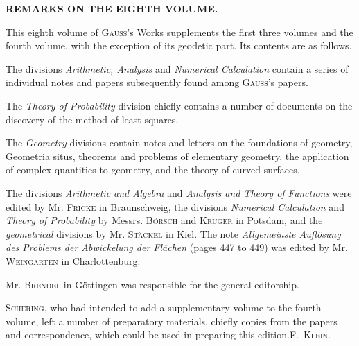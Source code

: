 \begin{center}\Large\bfseries REMARKS ON THE EIGHTH VOLUME.\end{center}

This eighth volume of \textsc{Gauss}'s Works supplements the first three volumes and the fourth volume, with the exception of its geodetic part. Its contents are as follows.

The divisions \textit{Arithmetic, Analysis} and \textit{Numerical Calculation} contain a series of individual notes and papers subsequently found among \textsc{Gauss}'s papers.

The \textit{Theory of Probability} division chiefly contains a number of documents on the discovery of the method of least squares.

The \textit{Geometry} divisions contain notes and letters on the foundations of geometry, Geometria situs, theorems and problems of elementary geometry, the application of complex quantities to geometry, and the theory of curved surfaces.

The divisions \textit{Arithmetic and Algebra} and \textit{Analysis and Theory of Functions} were edited by Mr. \textsc{Fricke} in Braunschweig, the divisions \textit{Numerical Calculation} and \textit{Theory of Probability} by Messrs. \textsc{Börsch} and \textsc{Krüger} in Potsdam, and the \textit{geometrical} divisions by Mr. \textsc{Stäckel} in Kiel. The note \textit{Allgemeinste Auflösung des Problems der Abwickelung der Flächen} (pages 447 to 449) was edited by Mr. \textsc{Weingarten} in Charlottenburg.

Mr. \textsc{Brendel} in Göttingen was responsible for the general editorship.

\textsc{Schering}, who had intended to add a supplementary volume to the fourth volume, left a number of preparatory materials, chiefly copies from the papers and correspondence, which could be used in preparing this edition.\hfill\mbox{\textsc{F. Klein.}}
